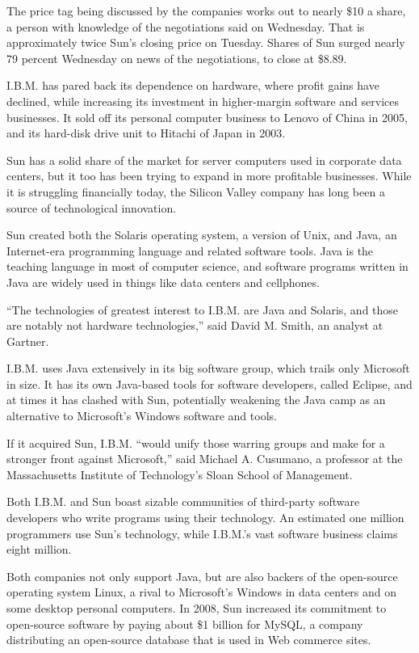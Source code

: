 \documentclass[12pt,a4paper,onecolumn]{article}
\begin{document}
\begin{CJK*}{GBK}{song}
The price tag being discussed by the companies works out to nearly \$10 a share, a person with
knowledge of the negotiations said on Wednesday. That is approximately twice Sun's closing price on
Tuesday. Shares of Sun surged nearly 79 percent Wednesday on news of the negotiations, to close at
\$8.89.

I.B.M. has pared back its dependence on hardware, where profit gains have declined, while increasing
its investment in higher-margin software and services businesses. It sold off its personal computer
business to Lenovo of China in 2005, and its hard-disk drive unit to Hitachi of Japan in 2003.

Sun has a solid share of the market for server computers used in corporate data centers, but it too
has been trying to expand in more profitable businesses. While it is struggling financially today,
the Silicon Valley company has long been a source of technological innovation.

Sun created both the Solaris operating system, a version of Unix, and Java, an Internet-era
programming language and related software tools. Java is the teaching language in most of computer
science, and software programs written in Java are widely used in things like data centers and
cellphones.

``The technologies of greatest interest to I.B.M. are Java and Solaris, and those are notably not
hardware technologies,'' said David M. Smith, an analyst at Gartner.

I.B.M. uses Java extensively in its big software group, which trails only Microsoft in size. It has
its own Java-based tools for software developers, called Eclipse, and at times it has clashed with
Sun, potentially weakening the Java camp as an alternative to Microsoft's Windows software and
tools.

If it acquired Sun, I.B.M. ``would unify those warring groups and make for a stronger front against
Microsoft,'' said Michael A. Cusumano, a professor at the Massachusetts Institute of Technology's
Sloan School of Management.

Both I.B.M. and Sun boast sizable communities of third-party software developers who write programs
using their technology. An estimated one million programmers use Sun's technology, while I.B.M.'s
vast software business claims eight million.

Both companies not only support Java, but are also backers of the open-source operating system
Linux, a rival to Microsoft's Windows in data centers and on some desktop personal computers. In
2008, Sun increased its commitment to open-source software by paying about \$1 billion for MySQL, a
company distributing an open-source database that is used in Web commerce sites.


\end{CJK*}
\end{document}
